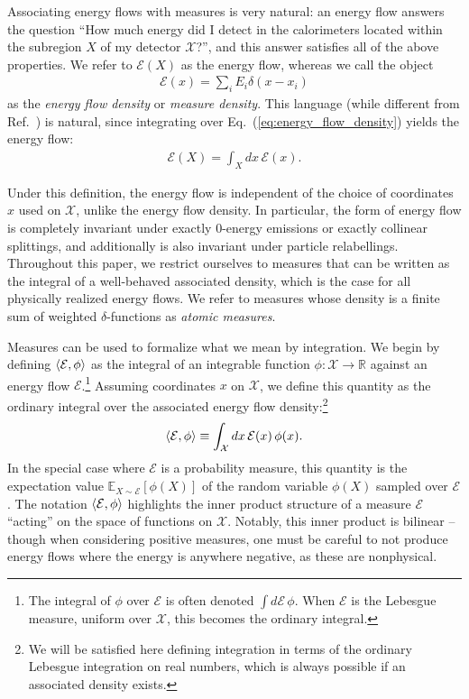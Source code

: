 \documentclass[letterpaper,11pt]{article}
\newcommand{\E}{\mathcal{E}}
\newcommand{\X}{\mathcal{X}}
\DeclareRobustCommand{\Eq}[1]{Eq.~(\ref{eq:#1})}
\DeclareRobustCommand{\Refer}[1]{Ref.~\cite{#1}}
\begin{document}
Associating energy flows with measures is very natural: an energy flow answers the question ``How much energy did I detect in the calorimeters located within the subregion $X$ of my detector $\X$?'', and this answer satisfies all of the above properties.
%
We refer to $\E(X)$ as the energy flow, whereas we call the object
%
\begin{align}
\label{eq:energy_flow_density}
    \E(x) = \sum_i E_i \delta(x-x_i)
\end{align}
%
as the \emph{energy flow density} or \emph{measure density}.
%
This language (while different from \Refer{2020}) is natural, since integrating over \Eq{energy_flow_density} yields the
energy flow:
%
\begin{align}
    \E(X) = \int_X dx\, \E(x). 
\end{align}
%


Under this definition, the energy flow is independent of the choice of coordinates $x$ used on $\X$, unlike the energy flow density. In particular, the form of energy flow is completely invariant under exactly 0-energy emissions or exactly collinear splittings, and additionally is also invariant under particle relabellings. Throughout this paper, we restrict ourselves to measures that can be written as the integral of a well-behaved associated density, which is the case for all physically realized energy flows. We refer to measures whose density is a finite sum of weighted $\delta$-functions as \emph{atomic measures}.



Measures can be used to formalize what we mean by integration. 
%
We begin by defining $\expval{\E, \phi}$ as the integral of an integrable function $\phi:\mathcal{X}\to\mathbb{R}$ against an energy flow $\E$.\footnote{The integral of $\phi$ over $\E$ is often denoted $\int d\E\,\phi$. When $\E$ is the Lebesgue measure, uniform over $\X$, this becomes the ordinary integral.}
%
Assuming coordinates $x$ on $\mathcal{X}$, we define this quantity as the ordinary integral over the associated energy flow density:\footnote{We will be satisfied here defining integration in terms of the ordinary Lebesgue integration on real numbers, which is always possible if an associated density exists.}
%
\begin{align}
    \expval{\E, \phi}  \equiv \int_\mathcal{X}dx\, \E(x) \, \phi(x).
\end{align}
%
In the special case where $\E$ is a probability measure, this quantity is the expectation value $\mathbb{E}_{X\sim\E}\left[\phi(X)\right]$ of the random variable $\phi(X)$ sampled over $\E$. The notation $\expval{\E, \phi}$ highlights the inner product structure of a measure $\E$ ``acting'' on the space of functions on $\X$. Notably, this inner product is bilinear -- though when considering positive measures, one must be careful to not produce energy flows where the energy is anywhere negative, as these are nonphysical. 
\end{document}
